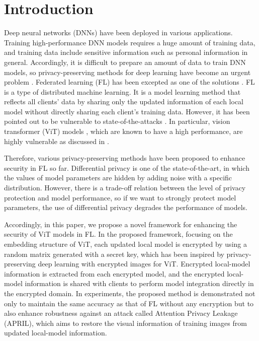 \documentclass[conference, a4paper]{IEEEtran}
\begin{document}
\section{Introduction}
\noindent
Deep neural networks (DNNs) have been deployed in various applications. Training high-performance DNN models requires a huge amount of training data, and training data include sensitive information such as personal information in general. Accordingly, it is difficult to prepare an amount of data to train DNN models, so privacy-preserving methods for deep learning have become an urgent problem \cite{SIP-2021-0048, 8486525}.
Federated learning (FL) has been excepted as one of the solutions \cite{pmlr-v54-mcmahan17a}. FL is a type of distributed machine learning. It is a model learning method that reflects all clients’ data by sharing only the updated information of each local model without directly sharing each client’s training data. However, it has been pointed out to be vulnerable to state-of-the-attacks \cite{NEURIPS2019_60a6c400, 10.5555/3495724.3497145, Lu_2022_CVPR}. In particular, vision transformer (ViT) models \cite{ViT}, which are known to have a high performance, are highly vulnerable as discussed in \cite{Lu_2022_CVPR}. 

Therefore, various privacy-preserving methods have been proposed to enhance security in FL so far. Differential privacy\cite{TCS-042} is one of the state-of-the-art, in which the values of model parameters are hidden by adding noise with a specific distribution. However, there is a trade-off relation between the level of privacy protection and model performance, so if we want to strongly protect model parameters, the use of differential privacy degrades the performance of models.

\indent Accordingly, in this paper, we propose a novel framework for enhancing the security of ViT models in FL. In the proposed framework, focusing on the embedding structure of ViT, each updated local model is encrypted by using a random matrix generated with a secret key, which has been inspired by privacy-preserving deep learning with encrypted images for ViT\cite{HitoshiKIYA20232022MUI0001, 9760030, 9909972, jimaging8090233}. Encrypted local-model information is extracted from each encrypted model, and the encrypted local-model information is shared with clients to perform model integration directly in the encrypted domain. In experiments, the proposed method is demonstrated not only to maintain the same accuracy as that of FL without any encryption but to also enhance robustness against an attack called Attention Privacy Leakage (APRIL)\cite{Lu_2022_CVPR}, which aims to restore the visual information of training images from updated local-model information.
\end{document}
